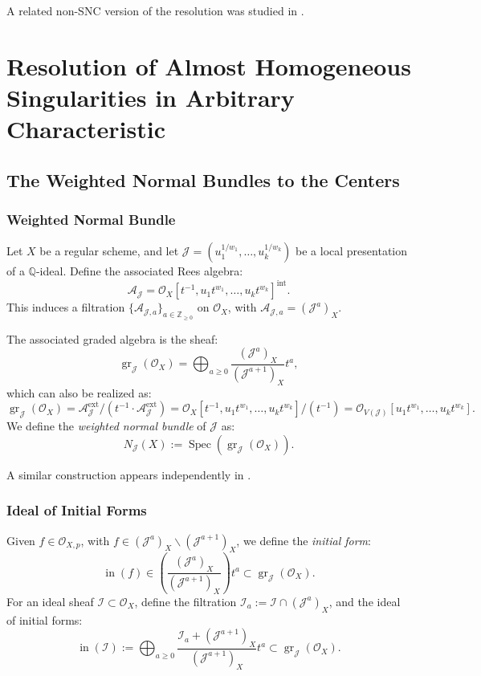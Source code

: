 \documentclass{amsart}
\newcommand{\QQ}{{\mathbb{Q}}}
\newcommand{\ZZ}{{\mathbb{Z}}}
\newcommand{\cA}{{\mathcal A}}
\newcommand{\cI}{{\mathcal I}}
\newcommand{\cJ}{{\mathcal J}}
\newcommand{\cO}{{\mathcal O}}
\newcommand{\ext}{{\operatorname{ext}}}
\newcommand{\inn}{\operatorname{in}}
\newcommand{\Spec}{\operatorname{Spec}}
\renewcommand{\setminus}{\smallsetminus}
\newcommand{\gr}{{\operatorname{gr}}}
\newcommand{\inte}{{\operatorname{int}}}
\begin{document}
A related non-SNC version of the resolution was studied in \cite{ATW-weighted}.


\section{Resolution of Almost Homogeneous Singularities in Arbitrary Characteristic} \label{free}


 \subsection{The Weighted Normal Bundles to the Centers}

\subsubsection{Weighted Normal Bundle} \label{cone}

Let \( X \) be a regular scheme, and let \( \cJ = (u_1^{1/w_1}, \ldots, u_k^{1/w_k}) \) be a local presentation of a \( \QQ \)-ideal. Define the associated Rees algebra:
\[
\cA_{\cJ} = \cO_X[t^{-1}, u_1 t^{w_1}, \ldots, u_k t^{w_k}]^\inte.
\]
This induces a filtration \( \{ \cA_{\cJ,a} \}_{a \in \ZZ_{\geq 0}} \) on \( \cO_X \), with \( \cA_{\cJ,a} = (\cJ^a)_X \).

The associated graded algebra is the sheaf:
\[
\gr_{\cJ}(\cO_X) = \bigoplus_{a \geq 0} \frac{(\cJ^a)_X}{(\cJ^{a+1})_X} t^a,
\]
which can also be realized as:
\[
\gr_{\cJ}(\cO_X) = \cA_{\cJ}^{\ext}/(t^{-1} \cdot \cA_{\cJ}^{\ext}) = \cO_X[t^{-1}, u_1 t^{w_1}, \ldots, u_k t^{w_k}]/(t^{-1})=\cO_{V(\cJ)}[u_1t^{w_1},\ldots,u_kt^{w_k}].
\]
We define the {\it weighted normal bundle} of \( \cJ \) as:
\[
N_{\cJ}(X) := \Spec(\gr_{\cJ}(\cO_X)).
\]

\begin{remark}
A similar construction appears independently in \cite{Rydh-proj}.
\end{remark}

\subsubsection{Ideal of Initial Forms}

Given \( f \in \cO_{X,p} \), with \( f \in (\cJ^a)_X \setminus (\cJ^{a+1})_X \), we define the {\it initial form}:
\[
\inn(f) \in \left( \frac{(\cJ^a)_X}{(\cJ^{a+1})_X} \right) t^a \subset \gr_{\cJ}(\cO_X).
\]
For an ideal sheaf \( \cI \subset \cO_X \), define the filtration \( \cI_a := \cI \cap (\cJ^a)_X \), and the ideal of initial forms:
\[
\inn(\cI) := \bigoplus_{a \geq 0} \frac{\cI_a + (\cJ^{a+1})_X}{(\cJ^{a+1})_X} t^a \subset \gr_{\cJ}(\cO_X).
\]
\end{document}
